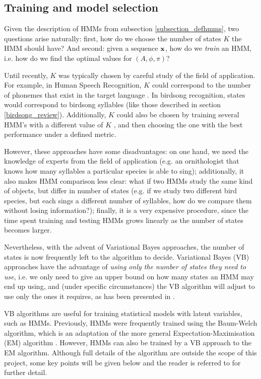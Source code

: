 \documentclass[../main.tex]{subfiles}
\begin{document}
\subsection{Training and model selection} \label{subsection_model}
Given the description of HMMs from subsection \ref{subsection_defhmms}, two questions arise naturally: first, how do we choose the number of states $K$ the HMM should have? And second: given a sequence $\mathbf{x}$, how do we \emph{train} an HMM, i.e. how do we find the optimal values for $(A, \phi, \pi)$?
\par Until recently, $K$ was typically chosen by careful study of the field of application. For example, in Human Speech Recognition, $K$ could correspond to the number of phonemes that exist in the target language \cite{Jurafsky2009}. In birdsong recognition, states would correspond to birdsong syllables (like those described in section \ref{birdsong_review}). Additionally, $K$ could also be chosen by training several HMM's with a different value of $K$ \cite{Siddiqi2007,Rezek2005}, and then choosing the one with the best performance under a defined metric.
\par However, these approaches have some disadvantages: on one hand, we need the knowledge of experts from the field of application (e.g. an ornithologist that knows how many syllables a particular species is able to sing); additionally, it also makes HMM comparison less clear: what if two HMMs study the same kind of objects, but differ in number of states (e.g. if we study two different bird species, but each sings a different number of syllables, how do we compare them without losing information?); finally, it is a very expensive procedure, since the time spent training and testing HMMs grows linearly as the number of states becomes larger.
\par Nevertheless, with the advent of Variational Bayes approaches, the number of states is now frequently left to the algorithm to decide. Variational Bayes (VB) approaches have the advantage of \emph{using only the number of states they need to use}, i.e. we only need to give an upper bound on how many states an HMM may end up using, and (under specific circumstances) the VB algorithm will adjust to use only the ones it requires, as has been presented in \cite{Rezek2005}.
\par VB algorithms are useful for training statistical models with latent variables, such as HMMs. Previously, HMMs were frequently trained using the Baum-Welch algorithm, which is an adaptation of the more general Expectation-Maximisation (EM) algorithm \cite{Ghahramani2001}. However, HMMs can also be trained by a VB approach to the EM algorithm. Although full details of the algorithm are outside the scope of this project, some key points will be given below and the reader is referred to \cite{Beal2001,Rezek2005,MacKay1997} for further detail.
\end{document}
